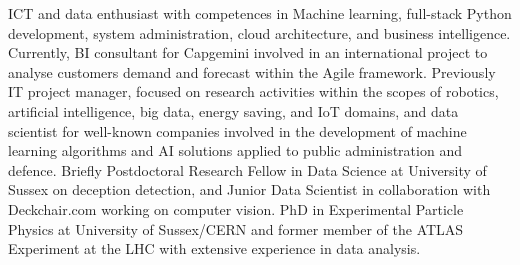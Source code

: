 
ICT and data enthusiast with competences in Machine learning, full-stack Python development, system administration, cloud architecture, and business intelligence. Currently, BI consultant for Capgemini involved in an international project to analyse customers demand and forecast within the Agile framework. Previously IT project manager, focused on research activities within the scopes of robotics, artificial intelligence, big data, energy saving, and IoT domains, and data scientist for well-known companies involved in the development of machine learning algorithms and AI solutions applied to public administration and defence. Briefly Postdoctoral Research Fellow in Data Science at University of Sussex on deception detection, and Junior Data Scientist in collaboration with Deckchair.com working on computer vision. PhD in Experimental Particle Physics at University of Sussex/CERN and former member of the ATLAS Experiment at the LHC with extensive experience in data analysis. 